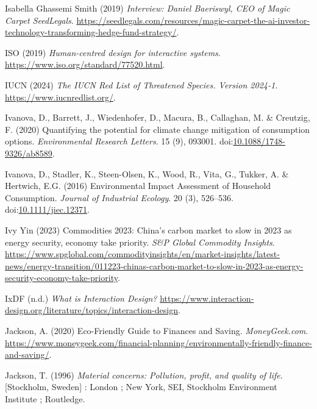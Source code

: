 \documentclass[
  letterpaper,
  DIV=11,
  numbers=noendperiod]{scrartcl}
\newlength{\cslhangindent}
\newenvironment{CSLReferences}[2] %
 {\begin{list}{}{%
  \setlength{\itemindent}{0pt}
  \setlength{\leftmargin}{0pt}
  \setlength{\parsep}{0pt}
  \ifodd #1
   \setlength{\leftmargin}{\cslhangindent}
   \setlength{\itemindent}{-1\cslhangindent}
  \fi
  \setlength{\itemsep}{#2\baselineskip}}}
 {\end{list}}
\begin{document}
\begin{CSLReferences}{0}{1}
Isabella Ghassemi Smith (2019) \emph{Interview: {Daniel Baeriswyl},
{CEO} of {Magic Carpet} {\textbar} {SeedLegals}}.
\url{https://seedlegals.com/resources/magic-carpet-the-ai-investor-technology-transforming-hedge-fund-strategy/}.

ISO (2019) \emph{Human-centred design for interactive systems}.
\url{https://www.iso.org/standard/77520.html}.

IUCN (2024) \emph{The {IUCN Red List} of {Threatened Species}. {Version}
2024-1.} \url{https://www.iucnredlist.org/}.

Ivanova, D., Barrett, J., Wiedenhofer, D., Macura, B., Callaghan, M. \&
Creutzig, F. (2020) Quantifying the potential for climate change
mitigation of consumption options. \emph{Environmental Research
Letters}. 15 (9), 093001.
doi:\href{https://doi.org/10.1088/1748-9326/ab8589}{10.1088/1748-9326/ab8589}.

Ivanova, D., Stadler, K., Steen-Olsen, K., Wood, R., Vita, G., Tukker,
A. \& Hertwich, E.G. (2016) Environmental {Impact Assessment} of
{Household Consumption}. \emph{Journal of Industrial Ecology}. 20 (3),
526--536.
doi:\href{https://doi.org/10.1111/jiec.12371}{10.1111/jiec.12371}.

Ivy Yin (2023) Commodities 2023: {China}'s carbon market to slow in 2023
as energy security, economy take priority. \emph{S\&P Global Commodity
Insights}.
\url{https://www.spglobal.com/commodityinsights/en/market-insights/latest-news/energy-transition/011223-chinas-carbon-market-to-slow-in-2023-as-energy-security-economy-take-priority}.

IxDF (n.d.) \emph{What is {Interaction Design}?}
\url{https://www.interaction-design.org/literature/topics/interaction-design}.

Jackson, A. (2020) Eco-{Friendly Guide} to {Finances} and {Saving}.
\emph{MoneyGeek.com}.
\url{https://www.moneygeek.com/financial-planning/environmentally-friendly-finance-and-saving/}.

Jackson, T. (1996) \emph{Material concerns: Pollution, profit, and
quality of life}. {[}Stockholm, Sweden{]} : London ; New York, SEI,
Stockholm Environment Institute ; Routledge.


\end{CSLReferences}
\end{document}
